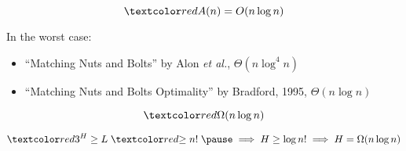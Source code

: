 \begin{frame}{}
  \centerline{}

  \pause
  \centerline{}

  \pause
  \[
    \red{A(n)} = O(n \log n)
  \]

  \pause
  \begin{alertblock}{In the worst case:}
    \begin{itemize}
      \item ``Matching Nuts and Bolts'' by Alon \emph{et al.}, $\Theta(n \log^4 n)$
      \item ``Matching Nuts and Bolts Optimality'' by Bradford, 1995, $\Theta(n \log n)$ 
    \end{itemize}
  \end{alertblock}
\end{frame}

\begin{frame}{}

  \[
    \red{\Omega(n \log n)}
  \]

  \pause
  \[
    \red{3^{H}} \ge L \;\red{\ge n!}\; \pause \implies H \ge \log n! \implies H = \Omega(n \log n)
  \]
\end{frame}
